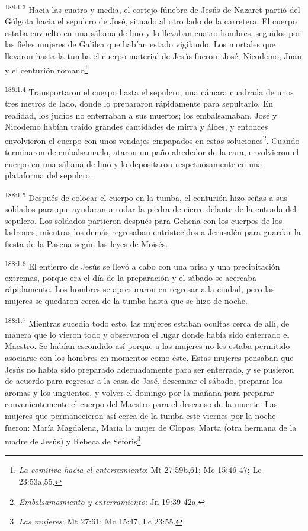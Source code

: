 \par
\textsuperscript{188:1.3} Hacia las cuatro y media, el cortejo fúnebre de Jesús de Nazaret partió del Gólgota hacia el sepulcro de José, situado al otro lado de la carretera. El cuerpo estaba envuelto en una sábana de lino y lo llevaban cuatro hombres, seguidos por las fieles mujeres de Galilea que habían estado vigilando. Los mortales que llevaron hasta la tumba el cuerpo material de Jesús fueron: José, Nicodemo, Juan y el centurión romano\footnote{\textit{La comitiva hacia el enterramiento}: Mt 27:59b,61; Mc 15:46-47; Lc 23:53a,55.}.

\par
\textsuperscript{188:1.4} Transportaron el cuerpo hasta el sepulcro, una cámara cuadrada de unos tres metros de lado, donde lo prepararon rápidamente para sepultarlo. En realidad, los judíos no enterraban a sus muertos; los embalsamaban. José y Nicodemo habían traído grandes cantidades de mirra y áloes, y entonces envolvieron el cuerpo con unos vendajes empapados en estas soluciones\footnote{\textit{Embalsamamiento y enterramiento}: Jn 19:39-42a.}. Cuando terminaron de embalsamarlo, ataron un paño alrededor de la cara, envolvieron el cuerpo en una sábana de lino y lo depositaron respetuosamente en una plataforma del sepulcro.

\par
\textsuperscript{188:1.5} Después de colocar el cuerpo en la tumba, el centurión hizo señas a sus soldados para que ayudaran a rodar la piedra de cierre delante de la entrada del sepulcro. Los soldados partieron después para Gehena con los cuerpos de los ladrones, mientras los demás regresaban entristecidos a Jerusalén para guardar la fiesta de la Pascua según las leyes de Moisés.

\par
\textsuperscript{188:1.6} El entierro de Jesús se llevó a cabo con una prisa y una precipitación extremas, porque era el día de la preparación y el sábado se acercaba rápidamente. Los hombres se apresuraron en regresar a la ciudad, pero las mujeres se quedaron cerca de la tumba hasta que se hizo de noche.

\par
\textsuperscript{188:1.7} Mientras sucedía todo esto, las mujeres estaban ocultas cerca de allí, de manera que lo vieron todo y observaron el lugar donde había sido enterrado el Maestro. Se habían escondido así porque a las mujeres no les estaba permitido asociarse con los hombres en momentos como éste. Estas mujeres pensaban que Jesús no había sido preparado adecuadamente para ser enterrado, y se pusieron de acuerdo para regresar a la casa de José, descansar el sábado, preparar los aromas y los ung\"uentos, y volver el domingo por la mañana para preparar convenientemente el cuerpo del Maestro para el descanso de la muerte. Las mujeres que permanecieron así cerca de la tumba este viernes por la noche fueron: María Magdalena, María la mujer de Clopas, Marta (otra hermana de la madre de Jesús) y Rebeca de Séforis\footnote{\textit{Las mujeres}: Mt 27:61; Mc 15:47; Lc 23:55.}.

